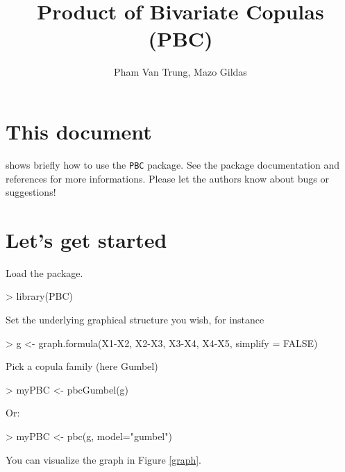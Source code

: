 \documentclass[a4paper]{article}
\title{Product of Bivariate Copulas (PBC)}
\author{Pham Van Trung, Mazo Gildas}
\begin{document}


\maketitle

\section*{This document}
shows briefly how to use the \verb?PBC? package. See the package documentation and references for more informations. Please let the authors know about bugs or suggestions!

\section*{Let's get started}
Load the package.
\begin{Schunk}
\begin{Sinput}
> library(PBC)
\end{Sinput}
\end{Schunk}
Set the underlying graphical structure you wish, for instance
\begin{Schunk}
\begin{Sinput}
> g <- graph.formula(X1-X2, X2-X3, X3-X4, X4-X5, simplify = FALSE)
\end{Sinput}
\end{Schunk}
Pick a copula family (here Gumbel)
\begin{Schunk}
\begin{Sinput}
> myPBC <- pbcGumbel(g)
\end{Sinput}
\end{Schunk}
Or:
\begin{Schunk}
\begin{Sinput}
> myPBC <- pbc(g, model="gumbel") 
\end{Sinput}
\end{Schunk}
You can visualize the graph in Figure \ref{graph}.
\end{document}
